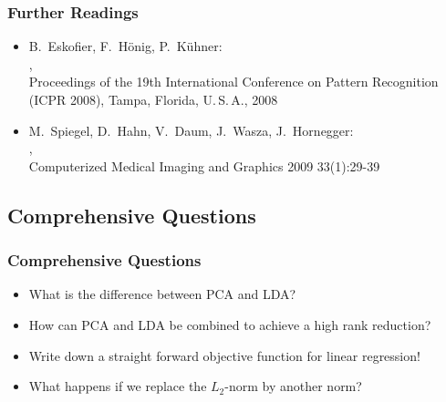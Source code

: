 \begin{frame}
	\frametitle{Further Readings \cont}


	\begin{itemize}
		\item B.~Eskofier, F.~H\"onig, P.~K\"uhner: \\
		      , \\
		      Proceedings of the 19th International Conference on Pattern Recognition (ICPR 2008), Tampa, Florida, U.\,S.\,A., 2008
	\end{itemize}
	\spread


	\begin{itemize}
		\item M.~Spiegel, D.~Hahn, V.~Daum, J.~Wasza, J.~Hornegger: \\
		      , \\
		      Computerized Medical Imaging and Graphics 2009 33(1):29-39
	\end{itemize}
\end{frame}


\subsection{Comprehensive Questions}

\begin{frame}
	\frametitle{Comprehensive Questions}

	\begin{itemize}
		\item What is the difference between PCA and LDA? \\[1cm]
		\item How can PCA and LDA be combined to achieve a high rank reduction? \\[1cm]
		\item Write down a straight forward objective function for linear regression! \\[1cm]
		\item What happens if we replace the $L_2$-norm by another norm?
	\end{itemize}
\end{frame}

